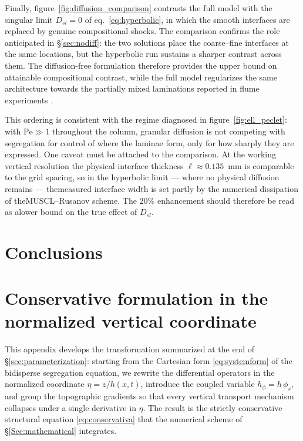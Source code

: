 \documentclass[lineno]{JFM-FLM_Au}
\begin{document}
Finally, figure~\ref{fig:diffusion_comparison} contrasts the full model with the singular limit $D_{sl} = 0$ of eq.~\eqref{eq:hyperbolic}, in which the smooth interfaces are replaced by genuine compositional shocks. The comparison confirms the role anticipated in \S\ref{sec:nodiff}: the two solutions place the coarse--fine interfaces at the same locations, but the hyperbolic run sustains a sharper contrast across them. The diffusion-free formulation therefore provides the upper bound on attainable compositional contrast, while the full model regularizes the same architecture towards the partially mixed laminations reported in flume experiments \citep{blom2003,kleinhans2004_34}.

This ordering is consistent with the regime diagnosed in
figure~\ref{fig:ell_peclet}: with $\mathrm{Pe} \gg 1$ throughout the column, granular diffusion is not competing with segregation for control of where the laminae form, only for how sharply they are expressed. One caveat must be attached to the comparison. At the working vertical resolution the physical interface thickness $\ell \approx 0.135$~mm is comparable to the grid spacing, so in the hyperbolic limit --- where no physical diffusion remains --- themeasured interface width is set partly by the numerical dissipation of theMUSCL--Rusanov scheme. The $20\%$ enhancement should therefore be read as alower bound on the true effect of $D_{sl}$.

\section{Conclusions}



\appendix

\section{Conservative formulation in the normalized vertical coordinate}
\label{app:conservative}

This appendix develops the transformation summarized at the end of \S\ref{sec:parameterization}: starting from the Cartesian form \eqref{eq:systemform} of the bidisperse segregation equation, we rewrite the differential operators in the normalized coordinate $\eta = z/h(x,t)$, introduce the coupled variable $h_\phi = h\,\phi_s$, and group the topographic gradients so that every vertical transport mechanism collapses under a single derivative in $\eta$. The result is the strictly conservative structural equation \eqref{eq:conservativa} that the numerical scheme of \S\ref{Sec:mathematical} integrates.
\end{document}
